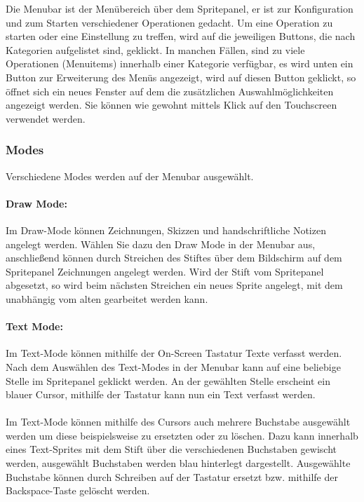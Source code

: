Die Menubar ist der Menübereich über dem Spritepanel, er ist zur Konfiguration und zum Starten verschiedener Operationen gedacht. Um eine Operation zu starten oder eine Einstellung zu treffen, wird auf die jeweiligen Buttons, die nach Kategorien aufgelistet sind, geklickt. In manchen Fällen, sind zu viele Operationen (Menuitems) innerhalb einer Kategorie verfügbar, es wird unten ein Button zur Erweiterung des Menüs angezeigt, wird auf diesen Button geklickt, so öffnet sich ein neues Fenster auf dem die zusätzlichen Auswahlmöglichkeiten angezeigt werden. Sie können wie gewohnt mittels Klick auf den Touchscreen verwendet werden.

\subsubsection{Modes}

Verschiedene Modes werden auf der Menubar ausgewählt.

\paragraph{Draw Mode:}
Im Draw-Mode können Zeichnungen, Skizzen und handschriftliche Notizen angelegt werden. Wählen Sie dazu den Draw Mode in der Menubar aus, anschließend können durch Streichen des Stiftes über dem Bildschirm auf dem Spritepanel Zeichnungen angelegt werden. Wird der Stift vom Spritepanel abgesetzt, so wird beim nächsten Streichen ein neues Sprite angelegt, mit dem unabhängig vom alten gearbeitet werden kann.

\paragraph{Text Mode:}

Im Text-Mode können mithilfe der On-Screen Tastatur Texte verfasst werden. Nach dem Auswählen des Text-Modes in der Menubar kann auf eine beliebige Stelle im Spritepanel geklickt werden. An der gewählten Stelle erscheint ein blauer Cursor, mithilfe der Tastatur kann nun ein Text verfasst werden.\\
\\
Im Text-Mode können mithilfe des Cursors auch mehrere Buchstabe ausgewählt werden um diese beispielsweise zu ersetzten oder zu löschen. Dazu kann innerhalb eines Text-Sprites mit dem Stift über die verschiedenen Buchstaben gewischt werden, ausgewählt Buchstaben werden blau hinterlegt dargestellt. Ausgewählte Buchstabe können durch Schreiben auf der Tastatur ersetzt bzw. mithilfe der Backspace-Taste gelöscht werden.

